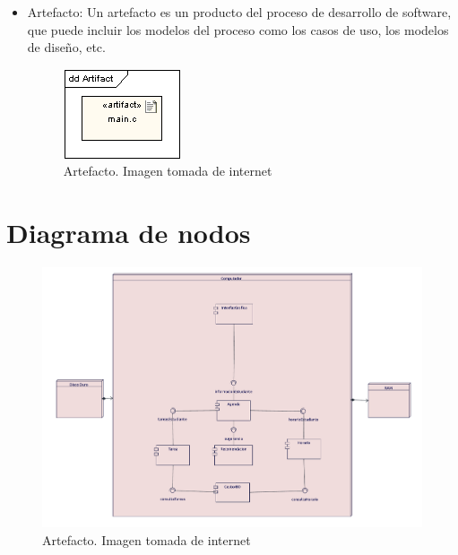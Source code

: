 \begin{itemize}
\item Artefacto: Un artefacto es un producto del proceso de desarrollo de software, que puede incluir los modelos del proceso como los casos de uso, los modelos de diseño, etc.

\begin{figure}[H]
	\centering
	\includegraphics[width=0.5\linewidth]{diseno/nodos/imgs/4}
	\caption{Artefacto. Imagen tomada de internet}
	\label{fig:gantt}
\end{figure}

\end{itemize}

\section{Diagrama de nodos}
\begin{figure}[H]
	\centering
	\includegraphics[width=0.8\linewidth]{diseno/nodos/imgs/nodos}
	\caption{Artefacto. Imagen tomada de internet}
	\label{fig:gantt}
\end{figure}
